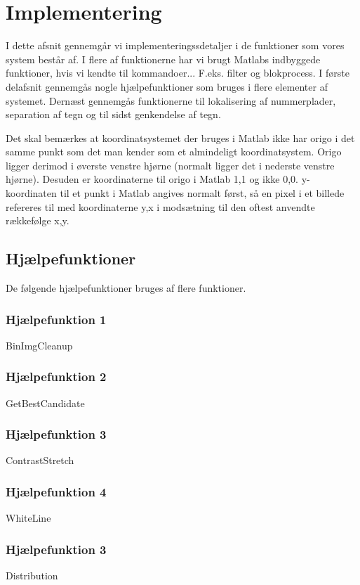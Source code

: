 \section{Implementering}
\label{sec:implementation}

I dette afsnit gennemgår vi implementeringssdetaljer i de funktioner som vores system består af. I flere af funktionerne har vi brugt Matlabs indbyggede funktioner, hvis vi kendte til kommandoer... F.eks. filter og blokprocess. I første delafsnit gennemgås nogle hjælpefunktioner som bruges i flere elementer af systemet. Dernæst gennemgås funktionerne til lokalisering af nummerplader, separation af tegn og til sidst genkendelse af tegn.

Det skal bemærkes at koordinatsystemet der bruges i Matlab ikke har origo i det samme punkt som det man kender som et almindeligt koordinatsystem. Origo ligger derimod i øverste venstre hjørne (normalt ligger det i nederste venstre hjørne). Desuden er koordinaterne til origo i Matlab 1,1 og ikke 0,0. y-koordinaten til et punkt i Matlab angives normalt først, så en pixel i et billede refereres til med koordinaterne y,x i modsætning til den oftest anvendte rækkefølge x,y.


\subsection{Hjælpefunktioner}
De følgende hjælpefunktioner bruges af flere funktioner.
\subsubsection{Hjælpefunktion 1}
BinImgCleanup
\subsubsection{Hjælpefunktion 2}
GetBestCandidate
\subsubsection{Hjælpefunktion 3}
ContrastStretch
\subsubsection{Hjælpefunktion 4}
WhiteLine 
\subsubsection{Hjælpefunktion 3}
Distribution

